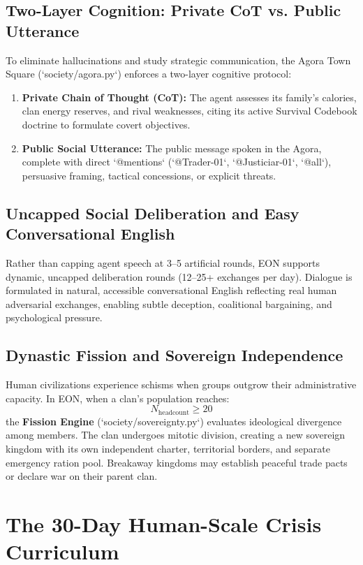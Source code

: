 \documentclass[11pt,a4paper]{article}
\begin{document}
\subsection{Two-Layer Cognition: Private CoT vs. Public Utterance}
To eliminate hallucinations and study strategic communication, the Agora Town Square (`society/agora.py`) enforces a two-layer cognitive protocol:
\begin{enumerate}[leftmargin=*]
    \item \textbf{Private Chain of Thought (CoT):} The agent assesses its family's calories, clan energy reserves, and rival weaknesses, citing its active Survival Codebook doctrine to formulate covert objectives.
    \item \textbf{Public Social Utterance:} The public message spoken in the Agora, complete with direct `@mentions` (`@Trader-01`, `@Justiciar-01`, `@all`), persuasive framing, tactical concessions, or explicit threats.
\end{enumerate}

\subsection{Uncapped Social Deliberation and Easy Conversational English}
Rather than capping agent speech at 3--5 artificial rounds, EON supports dynamic, uncapped deliberation rounds (12--25+ exchanges per day). Dialogue is formulated in natural, accessible conversational English reflecting real human adversarial exchanges, enabling subtle deception, coalitional bargaining, and psychological pressure.

\subsection{Dynastic Fission and Sovereign Independence}
Human civilizations experience schisms when groups outgrow their administrative capacity. In EON, when a clan's population reaches:
\begin{equation}
N_{\text{headcount}} \ge 20
\end{equation}
the \textbf{Fission Engine} (`society/sovereignty.py`) evaluates ideological divergence among members. The clan undergoes mitotic division, creating a new sovereign kingdom with its own independent charter, territorial borders, and separate emergency ration pool. Breakaway kingdoms may establish peaceful trade pacts or declare war on their parent clan.

\section{The 30-Day Human-Scale Crisis Curriculum}
\label{sec:crisis_curriculum}
\end{document}
